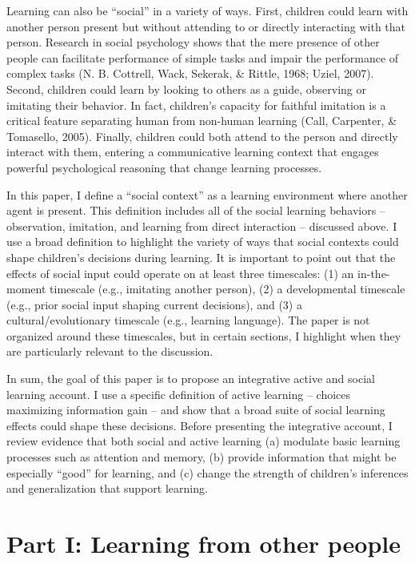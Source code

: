\documentclass[english,floatsintext,man]{apa6}
\theoremstyle{definition}
\theoremstyle{definition}
\theoremstyle{definition}
\theoremstyle{remark}
\begin{document}
Learning can also be \enquote{social} in a variety of ways. First,
children could learn with another person present but without attending
to or directly interacting with that person. Research in social
psychology shows that the mere presence of other people can facilitate
performance of simple tasks and impair the performance of complex tasks
(N. B. Cottrell, Wack, Sekerak, \& Rittle, 1968; Uziel, 2007). Second,
children could learn by looking to others as a guide, observing or
imitating their behavior. In fact, children's capacity for faithful
imitation is a critical feature separating human from non-human learning
(Call, Carpenter, \& Tomasello, 2005). Finally, children could both
attend to the person and directly interact with them, entering a
communicative learning context that engages powerful psychological
reasoning that change learning processes.

In this paper, I define a \enquote{social context} as a learning
environment where another agent is present. This definition includes all
of the social learning behaviors -- observation, imitation, and learning
from direct interaction -- discussed above. I use a broad definition to
highlight the variety of ways that social contexts could shape
children's decisions during learning. It is important to point out that
the effects of social input could operate on at least three timescales:
(1) an in-the-moment timescale (e.g., imitating another person), (2) a
developmental timescale (e.g., prior social input shaping current
decisions), and (3) a cultural/evolutionary timescale (e.g., learning
language). The paper is not organized around these timescales, but in
certain sections, I highlight when they are particularly relevant to the
discussion.

In sum, the goal of this paper is to propose an integrative active and
social learning account. I use a specific definition of active learning
-- choices maximizing information gain -- and show that a broad suite of
social learning effects could shape these decisions. Before presenting
the integrative account, I review evidence that both social and active
learning (a) modulate basic learning processes such as attention and
memory, (b) provide information that might be especially \enquote{good}
for learning, and (c) change the strength of children's inferences and
generalization that support learning.

\section{Part I: Learning from other
people}\label{part-i-learning-from-other-people}
\end{document}
